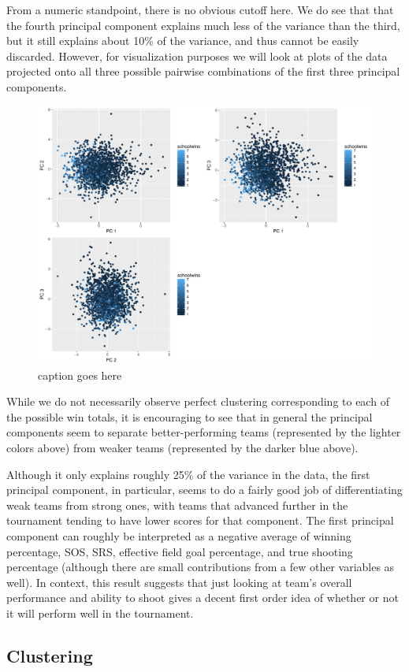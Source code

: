 \documentclass[10pt,a4paper, hidelinks]{article} %
\begin{document}
From a numeric standpoint, there is no obvious cutoff here. We do see that that the fourth principal component explains much less of the variance than the third, but it still explains about 10\% of the variance, and thus cannot be easily discarded. However, for visualization purposes we will look at plots of the data projected onto all three possible pairwise combinations of the first three principal components.

\begin{figure}[H]
	\centering
	\includegraphics[width=0.7\linewidth]{../fig/PrinComps}
	\caption{caption goes here}
	\label{fig:princomps}
\end{figure}


While we do not necessarily observe perfect clustering corresponding to each of the possible win totals, it is encouraging to see that in general the principal components seem to separate better-performing teams (represented by the lighter colors above) from weaker teams (represented by the darker blue above). 

Although it only explains roughly 25\% of the variance in the data, the first principal component, in particular, seems to do a fairly good job of differentiating weak teams from strong ones, with teams that advanced further in the tournament tending to have lower scores for that component. The first principal component can roughly be interpreted as a negative average of winning percentage, SOS, SRS, effective field goal percentage, and true shooting percentage (although there are small contributions from a few other variables as well). In context, this result suggests that just looking at team's overall performance and ability to shoot gives a decent first order idea of whether or not it will perform well in the tournament.

\subsection{Clustering}
\end{document}
